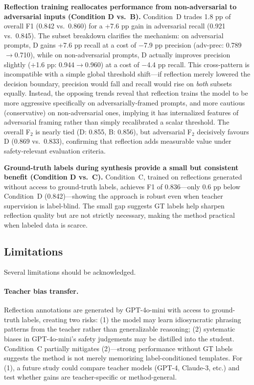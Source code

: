 \documentclass[ai,article,submit,pdftex,moreauthors]{Definitions/mdpi}
\begin{document}
\textbf{Reflection training reallocates performance from non-adversarial to adversarial inputs (Condition D vs.\ B).}
Condition~D trades 1.8 pp of overall F1 (0.842 vs.\ 0.860) for a +7.6 pp gain in adversarial recall (0.921 vs.\ 0.845). The subset breakdown clarifies the mechanism: on adversarial prompts, D gains +7.6 pp recall at a cost of $-$7.9 pp precision (adv-prec: 0.789$\to$0.710), while on non-adversarial prompts, D actually improves precision slightly ($+$1.6 pp: 0.944$\to$0.960) at a cost of $-$4.4 pp recall. This cross-pattern is incompatible with a simple global threshold shift---if reflection merely lowered the decision boundary, precision would fall and recall would rise on \emph{both} subsets equally. Instead, the opposing trends reveal that reflection trains the model to be more aggressive specifically on adversarially-framed prompts, and more cautious (conservative) on non-adversarial ones, implying it has internalized features of adversarial framing rather than simply recalibrated a scalar threshold. The overall F$_2$ is nearly tied (D: 0.855, B: 0.856), but adversarial F$_2$ decisively favours D (0.869 vs.\ 0.833), confirming that reflection adds measurable value under safety-relevant evaluation criteria.

\textbf{Ground-truth labels during synthesis provide a small but consistent benefit (Condition D vs.\ C).}
Condition~C, trained on reflections generated without access to ground-truth labels, achieves F1 of 0.836---only 0.6 pp below Condition~D (0.842)---showing the approach is robust even when teacher supervision is label-blind. The small gap suggests GT labels help sharpen reflection quality but are not strictly necessary, making the method practical when labeled data is scarce.

\subsection{Limitations}

Several limitations should be acknowledged.

\paragraph{Teacher bias transfer.}
Reflection annotations are generated by GPT-4o-mini with access to ground-truth labels, creating two risks: (1) the model may learn idiosyncratic phrasing patterns from the teacher rather than generalizable reasoning; (2) systematic biases in GPT-4o-mini's safety judgements may be distilled into the student. Condition~C partially mitigates (2)---strong performance without GT labels suggests the method is not merely memorizing label-conditioned templates. For (1), a future study could compare teacher models (GPT-4, Claude-3, etc.) and test whether gains are teacher-specific or method-general.
\end{document}
